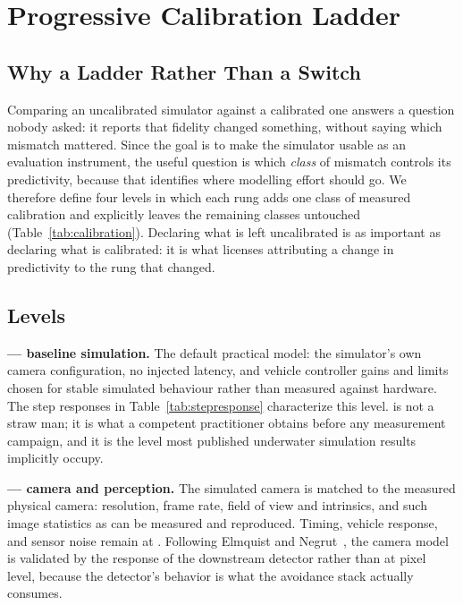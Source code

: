 \section{Progressive Calibration Ladder}
\label{sec:calibration}

\subsection{Why a Ladder Rather Than a Switch}

Comparing an uncalibrated simulator against a calibrated one answers a
question nobody asked: it reports that fidelity changed something, without
saying which mismatch mattered. Since the goal is to make the simulator
usable as an evaluation instrument, the useful question is which \emph{class}
of mismatch controls its predictivity, because that identifies where
modelling effort should go. We therefore define four levels in which each
rung adds one class of measured calibration and explicitly leaves the
remaining classes untouched (Table~\ref{tab:calibration}). Declaring what is
left uncalibrated is as important as declaring what is calibrated: it is what
licenses attributing a change in predictivity to the rung that changed.

\subsection{Levels}

\textbf{\SZERO{} --- baseline simulation.} The default practical model: the
simulator's own camera configuration, no injected latency, and vehicle
controller gains and limits chosen for stable simulated behaviour rather than
measured against hardware. The step responses in
Table~\ref{tab:stepresponse} characterize this level. \SZERO{} is not a straw
man; it is what a competent practitioner obtains before any measurement
campaign, and it is the level most published underwater simulation results
implicitly occupy.

\textbf{\SONE{} --- camera and perception.} The simulated camera is matched
to the measured physical camera: resolution, frame rate, field of view and
intrinsics, and such image statistics as can be measured and reproduced.
Timing, vehicle response, and sensor noise remain at \SZERO{}. Following
Elmquist and Negrut~\cite{elmquist2022aperform}, the camera model is
validated by the response of the downstream detector rather than at pixel
level, because the detector's behavior is what the avoidance stack actually
consumes. \CALIB

